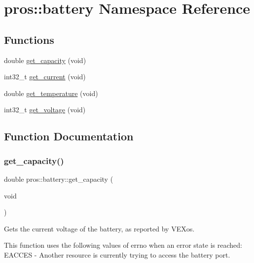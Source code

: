 \hypertarget{namespacepros_1_1battery}{}\section{pros\+:\+:battery Namespace Reference}
\label{namespacepros_1_1battery}
\subsection*{Functions}
\begin{DoxyCompactItemize}
\item 
double \hyperlink{namespacepros_1_1battery_a42876357c2ed5a047a535aca84f4458e}{get\+\_\+capacity} (void)
\item 
int32\+\_\+t \hyperlink{namespacepros_1_1battery_ad0f092e6341126d68ae15d41b5dba352}{get\+\_\+current} (void)
\item 
double \hyperlink{namespacepros_1_1battery_a33d1a503808ed06148a1884e3ccf88ae}{get\+\_\+temperature} (void)
\item 
int32\+\_\+t \hyperlink{namespacepros_1_1battery_a2c325b346f66c15ca7e5a844a66b20d9}{get\+\_\+voltage} (void)
\end{DoxyCompactItemize}


\subsection{Function Documentation}
\mbox{\label{namespacepros_1_1battery_a42876357c2ed5a047a535aca84f4458e}} 
\subsubsection{\texorpdfstring{get\+\_\+capacity()}{get\_capacity()}}
{\footnotesize\ttfamily double pros\+::battery\+::get\+\_\+capacity (\begin{DoxyParamCaption}\item[{void}]{ }\end{DoxyParamCaption})}

Gets the current voltage of the battery, as reported by V\+E\+Xos.

This function uses the following values of errno when an error state is reached\+: E\+A\+C\+C\+ES -\/ Another resource is currently trying to access the battery port.

